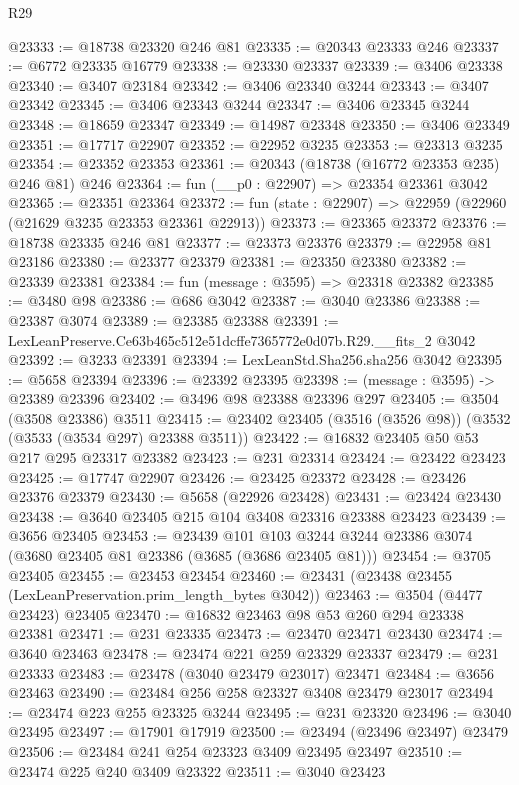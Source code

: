 \begin{lexlean}{R29}
\begin{coremodule}
@23333 := @18738 @23320 @246 @81
@23335 := @20343 @23333 @246
@23337 := @6772 @23335 @16779
@23338 := @23330 @23337
@23339 := @3406 @23338
@23340 := @3407 @23184
@23342 := @3406 @23340 @3244
@23343 := @3407 @23342
@23345 := @3406 @23343 @3244
@23347 := @3406 @23345 @3244
@23348 := @18659 @23347
@23349 := @14987 @23348
@23350 := @3406 @23349
@23351 := @17717 @22907
@23352 := @22952 @3235
@23353 := @23313 @3235
@23354 := @23352 @23353
@23361 := @20343 (@18738 (@16772 @23353 @235) @246 @81) @246
@23364 := fun (__p0 : @22907) => @23354 @23361 @3042
@23365 := @23351 @23364
@23372 := fun (state : @22907) => @22959 (@22960 (@21629 @3235 @23353 @23361 @22913))
@23373 := @23365 @23372
@23376 := @18738 @23335 @246 @81
@23377 := @23373 @23376
@23379 := @22958 @81 @23186
@23380 := @23377 @23379
@23381 := @23350 @23380
@23382 := @23339 @23381
@23384 := fun (message : @3595) => @23318 @23382
@23385 := @3480 @98
@23386 := @686 @3042
@23387 := @3040 @23386
@23388 := @23387 @3074
@23389 := @23385 @23388
@23391 := LexLeanPreserve.Ce63b465c512e51dcffe7365772e0d07b.R29.__fits_2 @3042
@23392 := @3233 @23391
@23394 := LexLeanStd.Sha256.sha256 @3042
@23395 := @5658 @23394
@23396 := @23392 @23395
@23398 := (message : @3595) -> @23389 @23396
@23402 := @3496 @98 @23388 @23396 @297
@23405 := @3504 (@3508 @23386) @3511
@23415 := @23402 @23405 (@3516 (@3526 @98)) (@3532 (@3533 (@3534 @297) @23388 @3511))
@23422 := @16832 @23405 @50 @53 @217 @295 @23317 @23382
@23423 := @231 @23314
@23424 := @23422 @23423
@23425 := @17747 @22907
@23426 := @23425 @23372
@23428 := @23426 @23376 @23379
@23430 := @5658 (@22926 @23428)
@23431 := @23424 @23430
@23438 := @3640 @23405 @215 @104 @3408 @23316 @23388 @23423
@23439 := @3656 @23405
@23453 := @23439
    @101
    @103
    @3244
    @3244
    @23386
    @3074
    (@3680 @23405 @81 @23386 (@3685 (@3686 @23405 @81)))
@23454 := @3705 @23405
@23455 := @23453 @23454
@23460 := @23431 (@23438 @23455 (LexLeanPreservation.prim_length_bytes @3042))
@23463 := @3504 (@4477 @23423) @23405
@23470 := @16832 @23463 @98 @53 @260 @294 @23338 @23381
@23471 := @231 @23335
@23473 := @23470 @23471 @23430
@23474 := @3640 @23463
@23478 := @23474 @221 @259 @23329 @23337
@23479 := @231 @23333
@23483 := @23478 (@3040 @23479 @23017) @23471
@23484 := @3656 @23463
@23490 := @23484 @256 @258 @23327 @3408 @23479 @23017
@23494 := @23474 @223 @255 @23325 @3244
@23495 := @231 @23320
@23496 := @3040 @23495
@23497 := @17901 @17919
@23500 := @23494 (@23496 @23497) @23479
@23506 := @23484 @241 @254 @23323 @3409 @23495 @23497
@23510 := @23474 @225 @240 @3409 @23322
@23511 := @3040 @23423

\end{coremodule}
\end{lexlean}
